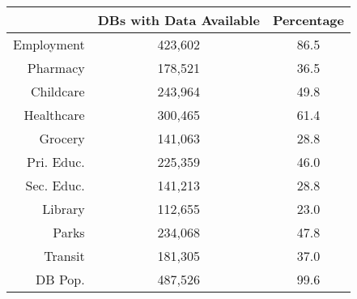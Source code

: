 \documentclass[11pt, a4paper]{article}
\begin{document}
\pagestyle{empty}


\begin{table}[ht]
\centering
\begin{tabular}{rcc}
  \hline
 & DBs with Data Available & Percentage \\ 
  \hline
Employment & 423,602 & 86.5 \\ 
  Pharmacy & 178,521 & 36.5 \\ 
  Childcare & 243,964 & 49.8 \\ 
  Healthcare & 300,465 & 61.4 \\ 
  Grocery & 141,063 & 28.8 \\ 
  Pri. Educ. & 225,359 & 46.0 \\ 
  Sec. Educ. & 141,213 & 28.8 \\ 
  Library & 112,655 & 23.0 \\ 
  Parks & 234,068 & 47.8 \\ 
  Transit & 181,305 & 37.0 \\ 
  DB Pop. & 487,526 & 99.6 \\ 
   \hline
\end{tabular}
\end{table}
\end{document}
